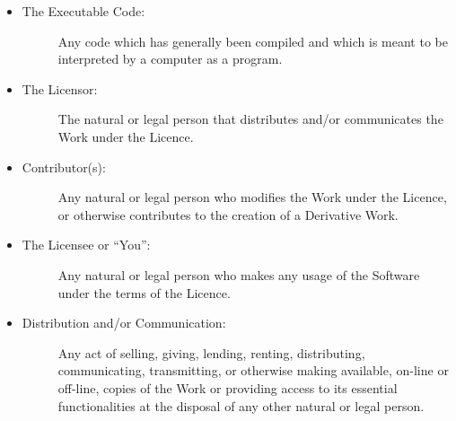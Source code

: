 \documentclass[letterpaper,10pt,english]{sphinxmanual}
\begin{document}
\begin{itemize}
\item {} \begin{description}
\item[{The Executable Code:}] \leavevmode
Any code which has generally been compiled and which is meant to be interpreted by a computer as a program.

\end{description}

\item {} \begin{description}
\item[{The Licensor:}] \leavevmode
The natural or legal person that distributes and/or communicates the Work under the Licence.

\end{description}

\item {} \begin{description}
\item[{Contributor(s):}] \leavevmode
Any natural or legal person who modifies the Work under the Licence, or otherwise contributes to the creation of a Derivative Work.

\end{description}

\item {} \begin{description}
\item[{The Licensee or “You”:}] \leavevmode
Any natural or legal person who makes any usage of the Software under the terms of the Licence.

\end{description}

\item {} \begin{description}
\item[{Distribution and/or Communication:}] \leavevmode
Any act of selling, giving, lending, renting,
distributing, communicating, transmitting, or otherwise making available, on-line or
off-line, copies of the Work or providing access to its essential functionalities at the
disposal of any other natural or legal person.

\end{description}

\end{itemize}
\end{document}
